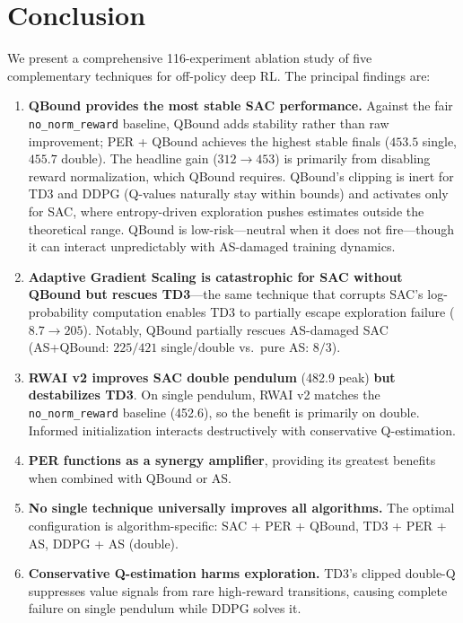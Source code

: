 \documentclass[11pt,a4paper]{article}
\begin{document}
\section{Conclusion}

We present a comprehensive 116-experiment ablation study of five complementary techniques for off-policy deep RL. The principal findings are:

\begin{enumerate}
\item \textbf{QBound provides the most stable SAC performance.} Against the fair \texttt{no\_norm\_reward} baseline, QBound adds stability rather than raw improvement; PER + QBound achieves the highest stable finals ($453.5$ single, $455.7$ double). The headline gain ($312 \to 453$) is primarily from disabling reward normalization, which QBound requires. QBound's clipping is inert for TD3 and DDPG (Q-values naturally stay within bounds) and activates only for SAC, where entropy-driven exploration pushes estimates outside the theoretical range. QBound is low-risk---neutral when it does not fire---though it can interact unpredictably with AS-damaged training dynamics.

\item \textbf{Adaptive Gradient Scaling is catastrophic for SAC without QBound but rescues TD3}---the same technique that corrupts SAC's log-probability computation enables TD3 to partially escape exploration failure ($8.7 \to 205$). Notably, QBound partially rescues AS-damaged SAC (AS+QBound: $225/421$ single/double vs.\ pure AS: $8/3$).

\item \textbf{RWAI v2 improves SAC double pendulum} (482.9 peak) \textbf{but destabilizes TD3}. On single pendulum, RWAI v2 matches the \texttt{no\_norm\_reward} baseline (452.6), so the benefit is primarily on double. Informed initialization interacts destructively with conservative Q-estimation.

\item \textbf{PER functions as a synergy amplifier}, providing its greatest benefits when combined with QBound or AS.

\item \textbf{No single technique universally improves all algorithms.} The optimal configuration is algorithm-specific: SAC + PER + QBound, TD3 + PER + AS, DDPG + AS (double).

\item \textbf{Conservative Q-estimation harms exploration.} TD3's clipped double-Q suppresses value signals from rare high-reward transitions, causing complete failure on single pendulum while DDPG solves it.
\end{enumerate}
\end{document}
